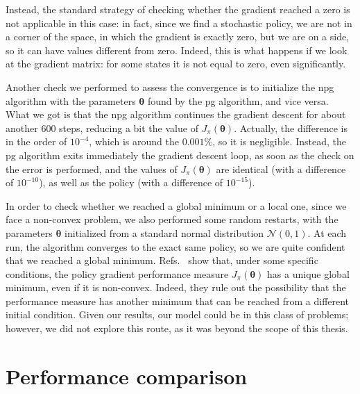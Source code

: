 Instead, the standard strategy of checking whether the gradient reached a zero is not applicable in this case: in fact, since we find a stochastic policy, we are not in a corner of the space, in which the gradient is exactly zero, but we are on a side, so it can have values different from zero. Indeed, this is what happens if we look at the gradient matrix: for some states it is not equal to zero, even significantly.

Another check we performed to assess the convergence is to initialize the \acrshort{npg} algorithm with the parameters $\boldsymbol \theta$ found by the \acrshort{pg} algorithm, and vice versa. What we got is that the \acrshort{npg} algorithm continues the gradient descent for about another $600$ steps, reducing a bit the value of $J_\pi(\boldsymbol \theta)$. Actually, the difference is in the order of $10^{-4}$, which is around the $0.001\%$, so it is negligible. Instead, the \acrshort{pg} algorithm exits immediately the gradient descent loop, as soon as the check on the error is performed, and the values of $J_\pi(\boldsymbol \theta)$ are identical (with a difference of $10^{-10}$), as well as the policy (with a difference of $10^{-15}$).

In order to check whether we reached a global minimum or a local one, since we face a non-convex problem, we also performed some random restarts, with the parameters $\boldsymbol \theta$ initialized from a standard normal distribution $\mathcal N(0,1)$. At each run, the algorithm converges to the exact same policy, so we are quite confident that we reached a global minimum. Refs.~\cite{Bhandari2019, bhandari2020note} show that, under some specific conditions, the policy gradient performance measure $J_\pi(\boldsymbol \theta)$ has a unique global minimum, even if it is non-convex. Indeed, they rule out the possibility that the performance measure has another minimum that can be reached from a different initial condition. Given our results, our model could be in this class of problems; however, we did not explore this route, as it was beyond the scope of this thesis.


\section{Performance comparison}

